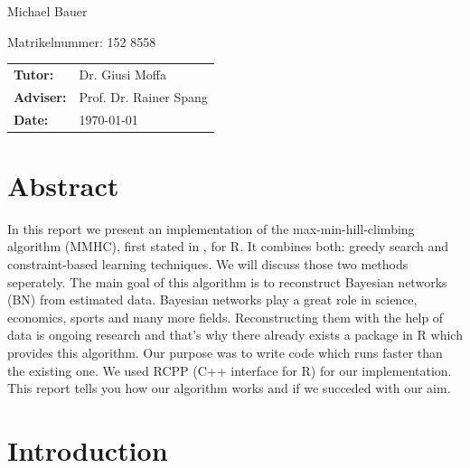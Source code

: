 \begin{center}
\begin{large}
Michael Bauer
\end{large}

\begin{small}
Matrikelnummer: 152 8558
\end{small}

\vspace{1cm}
\begin{tabular}{ll}
{\bf Tutor:} &Dr. Giusi Moffa\\
{\bf Adviser:} &Prof. Dr. Rainer Spang\\
{\bf Date:} &\today\\
\end{tabular}

\end{center}
\clearpage


\pagestyle{useheadings} %

\tableofcontents
\listoffigures

\chapter*{Abstract}

In this report we present an implementation of the max-min-hill-climbing algorithm (MMHC), first stated in \cite{TBA}, for R. It combines both: greedy search and constraint-based learning techniques. We will discuss those two methods seperately. The main goal of this algorithm is to reconstruct Bayesian networks (BN) from estimated data. Bayesian networks play a great role in science, economics, sports and many more fields. Reconstructing them with the help of data is ongoing research and that's why there already exists a package in R which provides this algorithm. Our purpose was to write code which runs faster than the existing one. We used RCPP (C++ interface for R) for our implementation. This report tells you how our algorithm works and if we succeded with our aim.

\chapter{Introduction}

